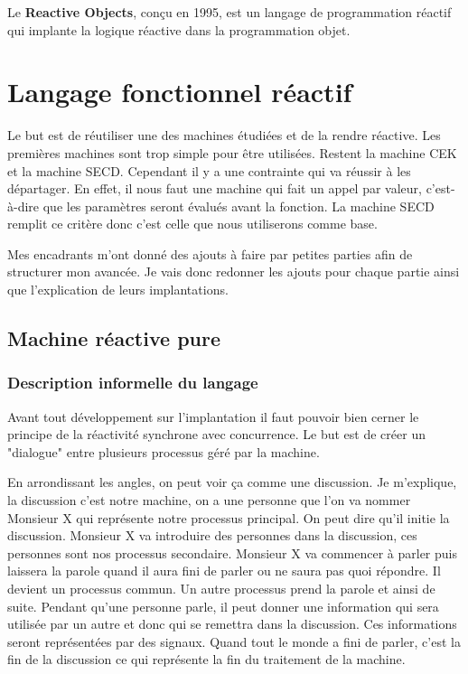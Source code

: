\documentclass[10pt,a4paper]{article}
\begin{document}
				Le \textbf{Reactive Objects}, conçu en 1995, est un langage de programmation réactif qui implante la logique réactive dans la programmation objet.
				
			
	\section{Langage fonctionnel réactif}\label{SECDConc4}
			
		Le but est de réutiliser une des machines étudiées et de la rendre réactive. Les premières machines sont trop simple pour être utilisées. Restent la machine CEK et la machine SECD. Cependant il y a une contrainte qui va réussir à les départager. En effet, il nous faut une machine qui fait un appel par valeur, c'est-à-dire que les paramètres seront évalués avant la fonction. La machine SECD remplit ce critère donc c'est celle que nous utiliserons comme base.
		\medbreak
			
		Mes encadrants m'ont donné des ajouts à faire par petites parties afin de structurer mon avancée. Je vais donc redonner les ajouts pour chaque partie ainsi que l'explication de leurs implantations.
		\bigbreak
			
			
		\subsection{Machine réactive pure}
		
			\subsubsection{Description informelle du langage}
				
				Avant tout développement sur l'implantation il faut pouvoir bien cerner le principe de la réactivité synchrone avec concurrence. Le but est de créer un "dialogue" entre plusieurs processus géré par la machine. 
				\medbreak
				
				En arrondissant les angles, on peut voir ça comme une discussion. Je m'explique, la discussion c'est notre machine, on a une personne que l'on va nommer Monsieur X qui représente notre processus principal. On peut dire qu'il initie la discussion. Monsieur X va introduire des personnes dans la discussion, ces personnes sont nos processus secondaire. Monsieur X va commencer à parler puis laissera la parole quand il aura fini de parler ou ne saura pas quoi répondre. Il devient un processus commun. Un autre processus prend la parole et ainsi de suite. Pendant qu'une personne parle, il peut donner une information qui sera utilisée par un autre et donc qui se remettra dans la discussion. Ces informations seront représentées par des signaux. Quand tout le monde a fini de parler, c'est la fin de la discussion ce qui représente la fin du traitement de la machine.
				\medbreak
				
\end{document}

